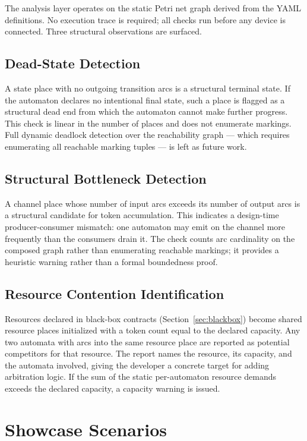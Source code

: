 The analysis layer operates on the static Petri net graph derived from the YAML definitions. No execution trace is required; all checks run before any device is connected. Three structural observations are surfaced.

\subsection{Dead-State Detection}

A state place with no outgoing transition arcs is a structural terminal state. If the automaton declares no intentional final state, such a place is flagged as a structural dead end from which the automaton cannot make further progress. This check is linear in the number of places and does not enumerate markings. Full dynamic deadlock detection over the reachability graph --- which requires enumerating all reachable marking tuples --- is left as future work.

\subsection{Structural Bottleneck Detection}

A channel place whose number of input arcs exceeds its number of output arcs is a structural candidate for token accumulation. This indicates a design-time producer-consumer mismatch: one automaton may emit on the channel more frequently than the consumers drain it. The check counts arc cardinality on the composed graph rather than enumerating reachable markings; it provides a heuristic warning rather than a formal boundedness proof.

\subsection{Resource Contention Identification}

Resources declared in black-box contracts (Section~\ref{sec:blackbox}) become shared resource places initialized with a token count equal to the declared capacity. Any two automata with arcs into the same resource place are reported as potential competitors for that resource. The report names the resource, its capacity, and the automata involved, giving the developer a concrete target for adding arbitration logic. If the sum of the static per-automaton resource demands exceeds the declared capacity, a capacity warning is issued.

\section{Showcase Scenarios}
\label{sec:petri-showcase}


